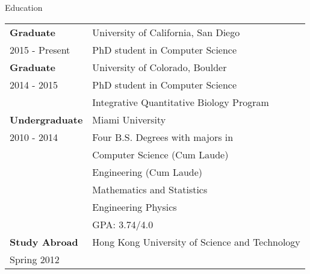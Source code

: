 \documentclass{resume} %
\begin{document}
\begin{rSection}{Education}
  \begin{tabular}{ll}
    \textbf{Graduate}    & University of California, San Diego  \\
    2015 - Present  & PhD student in Computer Science \\
    \textbf{Graduate}    & University of Colorado, Boulder \\
    2014 - 2015  & PhD student in Computer Science \\
                    & Integrative Quantitative Biology Program \\
    \textbf{Undergraduate}    & Miami University \\
    2010 - 2014   & Four B.S. Degrees with majors in\\
    & Computer Science (Cum Laude)\\
    & Engineering (Cum Laude)\\
    & Mathematics and Statistics \\
    & Engineering Physics \\
    & GPA: 3.74/4.0 \\
    \textbf{Study Abroad} &  Hong Kong University of Science and Technology   \\
    Spring 2012 \\
  \end{tabular}

\end{rSection}
\end{document}
